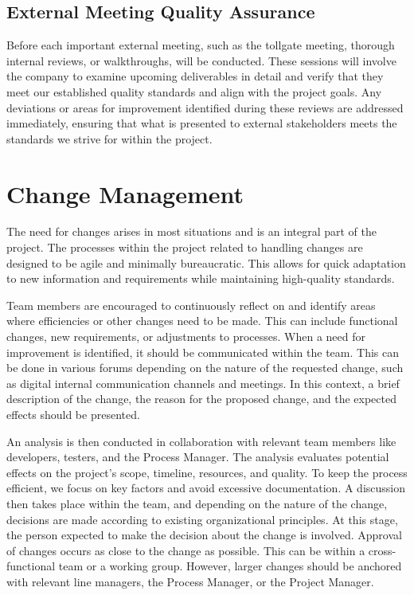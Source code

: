 \documentclass{article}
\begin{document}
\subsection{External Meeting Quality Assurance}
Before each important external meeting, such as the tollgate meeting, thorough internal reviews, or walkthroughs, will be conducted. These sessions will involve the company to examine upcoming deliverables in detail and verify that they meet our established quality standards and align with the project goals. Any deviations or areas for improvement identified during these reviews are addressed immediately, ensuring that what is presented to external stakeholders meets the standards we strive for within the project.



\newpage
\section{Change Management}

The need for changes arises in most situations and is an integral part of the project. The processes within the project related to handling changes are designed to be agile and minimally bureaucratic. This allows for quick adaptation to new information and requirements while maintaining high-quality standards.

Team members are encouraged to continuously reflect on and identify areas where efficiencies or other changes need to be made. This can include functional changes, new requirements, or adjustments to processes. When a need for improvement is identified, it should be communicated within the team. This can be done in various forums depending on the nature of the requested change, such as digital internal communication channels and meetings. In this context, a brief description of the change, the reason for the proposed change, and the expected effects should be presented.

An analysis is then conducted in collaboration with relevant team members like developers, testers, and the Process Manager. The analysis evaluates potential effects on the project’s scope, timeline, resources, and quality. To keep the process efficient, we focus on key factors and avoid excessive documentation. A discussion then takes place within the team, and depending on the nature of the change, decisions are made according to existing organizational principles. At this stage, the person expected to make the decision about the change is involved. Approval of changes occurs as close to the change as possible. This can be within a cross-functional team or a working group. However, larger changes should be anchored with relevant line managers, the Process Manager, or the Project Manager.
\end{document}
